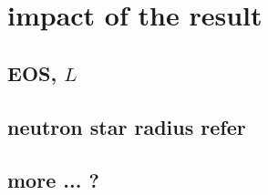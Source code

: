 \section{impact of the result}
\subsection{EOS, $L$}


\subsection{neutron star radius refer}

\subsection{more ... ?}







